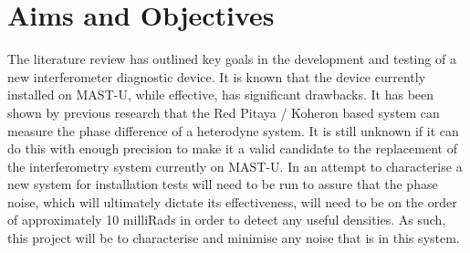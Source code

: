 \documentclass[12pt,a4paper,oneside]{report}
\begin{document}

\chapter{Aims and Objectives}
The literature review has outlined key goals in the development and testing of a new interferometer diagnostic device. It is known that the device currently installed on MAST-U, while effective, has significant drawbacks. It has been shown by previous research \cite{Hickling2017InvestigationMAST-U} that the Red Pitaya / Koheron based system can measure the phase difference of a heterodyne system. It is still unknown if it can do this with enough precision to make it a valid candidate to the replacement of the interferometry system currently on MAST-U. In an attempt to characterise a new system for installation tests will need to be run to assure that the phase noise, which will ultimately dictate its effectiveness, will need to be on the order of approximately 10 milliRads in order to detect any useful densities. As such, this project will be to characterise and minimise any noise that is in this system. \\
\end{document}
